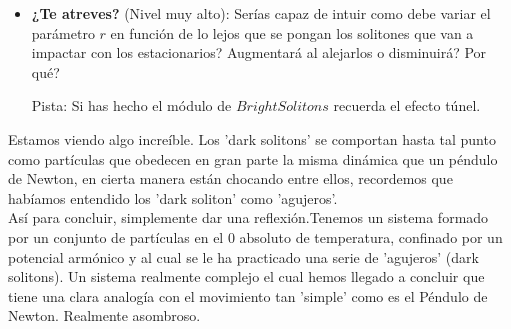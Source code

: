 \begin{itemize}
	\item \textbf{¿Te atreves?} (Nivel muy alto): Ser\'ias capaz de intuir como debe variar el par\'ametro $r$ en funci\'on de lo lejos que se pongan los solitones que van a impactar con los estacionarios? Augmentar\'a al alejarlos o disminuir\'a? Por qu\'e?
	
	Pista: Si has hecho el m\'odulo de $Bright Solitons$ recuerda el efecto t\'unel.
\end{itemize}

Estamos viendo algo incre\'ible. Los 'dark solitons' se comportan hasta tal punto como part\'iculas que obedecen en gran parte la misma din\'amica que un p\'endulo de Newton, en cierta manera est\'an chocando entre ellos, recordemos que hab\'iamos entendido los 'dark soliton' como 'agujeros'.
\\

As\'i para concluir, simplemente dar una reflexi\'on.Tenemos un sistema formado por un conjunto de part\'iculas en el 0 absoluto de temperatura, confinado por un potencial arm\'onico y al cual se le ha practicado una serie de 'agujeros' (dark solitons). Un sistema realmente complejo el cual hemos llegado a concluir que tiene una clara analog\'ia con el movimiento tan 'simple' como es el P\'endulo de Newton. Realmente asombroso.